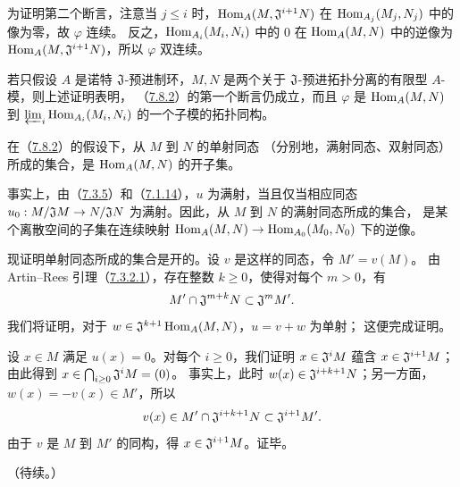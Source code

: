 \begin{sloppypar}
为证明第二个断言，注意当 $j\leq i$ 时，$\operatorname{Hom}_A(M,\mathfrak J^{i+1}N)$ 在
$\operatorname{Hom}_{A_j}(M_j,N_j)$ 中的像为零，故 $\varphi$ 连续。
反之，$\operatorname{Hom}_{A_i}(M_i,N_i)$ 中的 $0$ 在 $\operatorname{Hom}_A(M,N)$ 中的逆像为
$\operatorname{Hom}_A(M,\mathfrak J^{i+1}N)$，所以 $\varphi$ 双连续。
\end{sloppypar}


若只假设 $A$ 是诺特 $\mathfrak J$-预进制环，$M,N$ 是两个关于
$\mathfrak J$-预进拓扑分离的有限型 $A$-模，则上述证明表明，
（\hyperlink{para:0:7.8.2}{7.8.2}）的第一个断言仍成立，而且 $\varphi$ 是
$\operatorname{Hom}_A(M,N)$ 到 $\varprojlim_i\operatorname{Hom}_{A_i}(M_i,N_i)$ 的一个子模的拓扑同构。

在（\hyperlink{para:0:7.8.2}{7.8.2}）的假设下，从 $M$ 到 $N$ 的单射同态
（分别地，满射同态、双射同态）所成的集合，是 $\operatorname{Hom}_A(M,N)$ 的开子集。

事实上，由（\hyperlink{para:0:7.3.5}{7.3.5}）和（\hyperlink{para:0:7.1.14}{7.1.14}），$u$ 为满射，当且仅当相应同态
$u_0:M/\mathfrak J M\to N/\mathfrak J N$ 为满射。因此，从 $M$ 到 $N$ 的满射同态所成的集合，
是某个离散空间的子集在连续映射
$\operatorname{Hom}_A(M,N)\to\operatorname{Hom}_{A_0}(M_0,N_0)$ 下的逆像。

现证明单射同态所成的集合是开的。设 $v$ 是这样的同态，令 $M'=v(M)$。
由 Artin--Rees 引理（\hyperlink{para:0:7.3.2.1}{7.3.2.1}），存在整数 $k\geq0$，使得对每个 $m>0$，有
\[
 M'\cap\mathfrak J^{m+k}N\subset\mathfrak J^mM'.
\]
我们将证明，对于 $w\in\mathfrak J^{k+1}\operatorname{Hom}_A(M,N)$，$u=v+w$ 为单射；
这便完成证明。

设 $x\in M$ 满足 $u(x)=0$。对每个 $i\geq0$，我们证明
$x\in\mathfrak J^iM$ 蕴含 $x\in\mathfrak J^{i+1}M$；由此得到
$x\in\bigcap_{i\geq0}\mathfrak J^iM=(0)$。
事实上，此时 $w(x)\in\mathfrak J^{i+k+1}N$；另一方面，$w(x)=-v(x)\in M'$，所以
\[
 v(x)\in M'\cap\mathfrak J^{i+k+1}N\subset\mathfrak J^{i+1}M'.
\]
由于 $v$ 是 $M$ 到 $M'$ 的同构，得 $x\in\mathfrak J^{i+1}M$。证毕。

\begin{flushright}
（待续。）
\end{flushright}



\par




